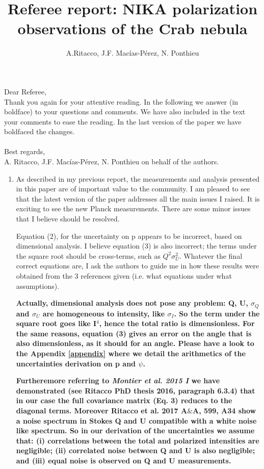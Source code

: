 \documentclass[12pt]{article}
\title{Referee report: NIKA polarization observations of the Crab nebula}
\author{A.Ritacco, J.F. Macías-Pérez, N. Ponthieu}
\begin{document}
\maketitle

\noindent Dear Referee,\\
Thank you again for your attentive reading. 
In the following we answer (in boldface) to your questions and comments. 
We have also included in the text your comments to ease the reading.
In the last version of the paper we have boldfaced the changes. \\  \\
Best regards,\\
A. Ritacco, J.F. Macías-Pérez, N. Ponthieu on behalf of the authors.


\begin{enumerate}
    \item 
{
As described in my previous report, the measurements and analysis 
presented in this paper are of important value to the community. I am 
pleased to see that the latest version of the paper addresses all the 
main issues I raised. It is exciting to see the new Planck 
measurements. There are some minor issues that I believe 
should be resolved. 
}

Equation (2), for the uncertainty on p appears to be incorrect, based 
on dimensional analysis. I believe equation (3) is also incorrect; 
the terms under the square root should be cross-terms, such as 
$Q^2\sigma_U^2$. Whatever the final correct equations are, I ask the 
authors to guide me in how these results were obtained from the 3 
references given (i.e. what equations under what assumptions).

{\bf Actually, dimensional analysis does not pose any problem: Q, U, $\sigma_Q$ and $\sigma_U$ are homogeneous to intensity, like $\sigma_I$. So the term under the square root goes like I$^4$, hence the total ratio is dimensionless. For the same reasons, equation (3) gives an error on the angle that is also dimensionless, as it should for an angle. Please have a look to the Appendix \ref{appendix} where we detail the arithmetics of the uncertainties derivation on p and $\psi$. }

{\bf Furtheremore referring to {\it Montier et al. 2015 I} we have demonstrated (see Ritacco PhD thesis 2016, paragraph 6.3.4) that in our case the full covariance matrix (Eq. 3) reduces to the diagonal terms. Moreover Ritacco et al. 2017 A$\&$A, 599, A34 show a noise spectrum in Stokes Q and U compatible with a white noise like spectrum. So in our derivation of the uncertainties we assume that: (i) correlations between the total and polarized intensities are negligible; (ii) correlated noise between Q and U is also negligible; and (iii) equal noise is observed on Q and U measurements.}


\end{enumerate}
\end{document}
